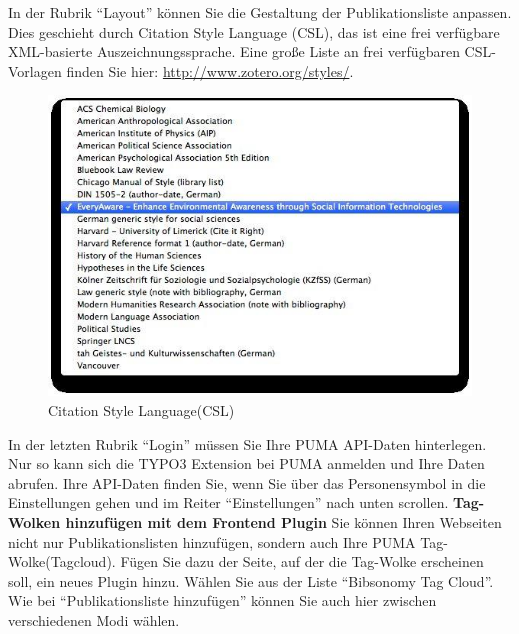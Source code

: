 In der Rubrik \enquote{Layout} können Sie die Gestaltung der Publikationsliste anpassen. Dies geschieht durch Citation Style Language (CSL), das ist eine frei verfügbare XML-basierte Auszeichnungssprache. Eine große Liste an frei verfügbaren CSL-Vorlagen finden Sie hier: \url{http://www.zotero.org/styles/}.\begin{figure}[ht]
 \centering
 \includegraphics[scale=0.4]{puma-101}
 \caption{Citation Style Language(CSL)}
 \label{figure1}
\end{figure}
\newline
\newline
In der letzten Rubrik \enquote{Login} müssen Sie Ihre PUMA API-Daten hinterlegen. Nur so kann sich die TYPO3 Extension bei PUMA anmelden und Ihre Daten abrufen. Ihre API-Daten finden Sie, wenn Sie über das Personensymbol in die Einstellungen gehen und im Reiter \enquote{Einstellungen} nach unten scrollen. \newline
\newline
\textbf{Tag-Wolken hinzufügen mit dem Frontend Plugin}\newline\newline
Sie können Ihren Webseiten nicht nur Publikationslisten hinzufügen, sondern auch Ihre PUMA  Tag-Wolke(Tagcloud). Fügen Sie dazu der Seite, auf der die Tag-Wolke erscheinen soll, ein neues Plugin hinzu. Wählen Sie aus der Liste \enquote{Bibsonomy Tag Cloud}.\newline \newline 
Wie bei \enquote{Publikationsliste hinzufügen} können Sie auch hier zwischen verschiedenen Modi wählen.\newline \newline 
